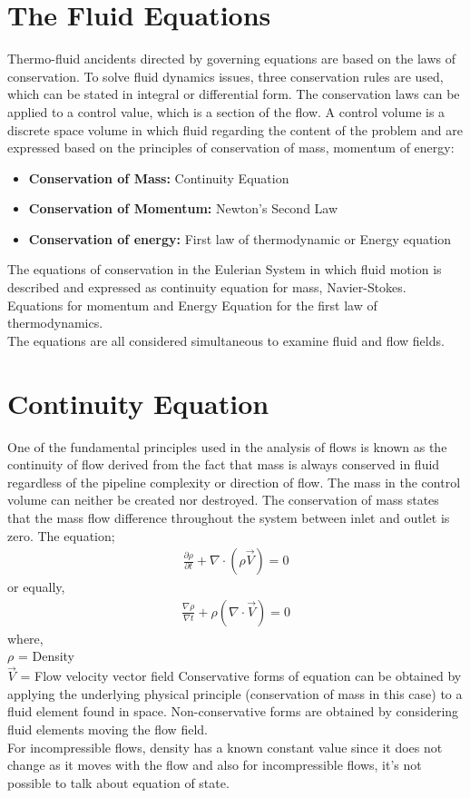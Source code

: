 \documentclass[11pt]{report}
\newcommand{\bt}[1]{\textbf{#1}}
\begin{document}
	
	\section{The Fluid Equations}
	Thermo-fluid ancidents directed by governing equations are based on the laws of conservation. To solve fluid dynamics issues, three conservation rules are used, which can be stated in integral or differential form. The conservation laws can be applied to a control value, which is a section of the flow. A control volume is a discrete space volume in which fluid regarding the content of the problem and are expressed based on the principles of conservation of mass, momentum of  energy:
	\begin{itemize}[label=--]
		\item\bt{Conservation of Mass:} Continuity Equation
		\item\bt{Conservation of Momentum:} Newton's Second Law
		\item\bt{Conservation of energy:} First law of thermodynamic or Energy equation
	\end{itemize}
	The equations of conservation in the Eulerian System in which fluid motion is described and expressed as continuity equation for mass, Navier-Stokes. Equations for momentum and Energy Equation for the first law of thermodynamics.\\
	The equations are all considered simultaneous to examine fluid and flow fields.
	
	\section{Continuity Equation}
	One of the fundamental principles used in the analysis of flows is known as the continuity of flow derived from the fact that mass is always conserved in fluid regardless of the pipeline complexity or direction of flow. The mass in the control volume can neither be created nor destroyed. The conservation of mass states that the mass flow difference throughout the system between inlet and outlet is zero. The equation;
	\begin{eqnarray}
		\frac{\partial \rho}{\partial t} + \nabla \cdot (\rho \vec{V}) = 0 \label{eq:2_1}
	\end{eqnarray}
	or equally,
	\begin{eqnarray}
		\frac{\nabla \rho}{\nabla t} + \rho(\nabla \cdot \vec{V}) = 0 \label{eq:2_2}
	\end{eqnarray}
	where, \\
	\hspace*{1cm} $\rho$ = Density\\
	\hspace*{1cm} $\vec{V}$ = Flow velocity vector field
	Conservative forms of equation can be obtained by applying the underlying physical principle (conservation of mass in this case) to a fluid element found in space. Non-conservative forms are obtained by considering fluid elements moving the flow field.\\
	For incompressible flows, density has a known constant value since it does not change as it moves with the flow and also for incompressible flows, it's not possible to talk about equation of state.
	
\end{document}
